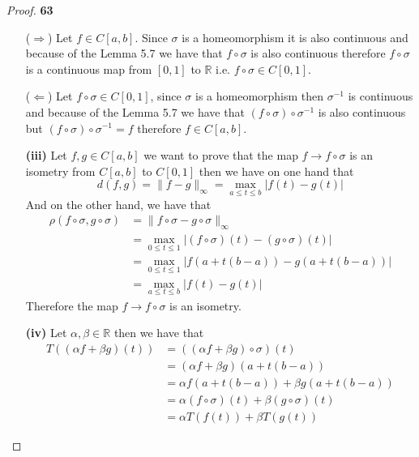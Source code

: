 \documentclass[11pt]{article}
\newcommand{\R}{\mathbb{R}}
\theoremstyle{definition}
\begin{document}
\begin{proof}{\textbf{63}}
\begin{itemize}
            ($\Rightarrow$) Let $f \in C[a,b]$. Since $\sigma$ is 
            a homeomorphism it is also continuous and because of the Lemma 5.7
            we have that $f \circ \sigma$ is also continuous therefore
            $f \circ \sigma$ is a continuous map from $[0,1]$ to $\R$ i.e.
            $f \circ \sigma \in C[0,1]$.

            ($\Leftarrow$) Let $f \circ \sigma \in C[0,1]$, since $\sigma$ is
            a homeomorphism then $\sigma^{-1}$ is continuous and because of the
            Lemma 5.7 we have that $(f \circ \sigma) \circ \sigma^{-1}$ is
            also continuous but $(f \circ \sigma) \circ \sigma^{-1} = f$
            therefore $f \in C[a,b]$.
\cleardoublepage
            \item [\textbf{(iii)}] Let $f,g \in C[a,b]$ we want to prove that
            the map $f \to f\circ\sigma$ is an isometry from $C[a,b]$ to
            $C[0,1]$ then we have on one hand that 
            $$d(f,g) = \|f - g\|_\infty = \max_{a\leq t\leq b}{|f(t) - g(t)|}$$
            And on the other hand, we have that
            \begin{align*}
                \rho(f\circ\sigma, g\circ\sigma)
                &= \|f\circ \sigma - g\circ \sigma\|_\infty\\
                &= \max_{0\leq t\leq 1}{|(f \circ \sigma)(t) - (g\circ\sigma)(t)|}\\
                &= \max_{0\leq t\leq 1}{|f(a + t(b-a)) - g(a + t(b-a))|}\\
                &= \max_{a\leq t\leq b}{|f(t) - g(t)|}
            \end{align*}
            Therefore the map $f \to f \circ\sigma$ is an isometry.

            \item [\textbf{(iv)}] Let $\alpha, \beta \in \R$ then we have that
            \begin{align*}
                T((\alpha f + \beta g)(t)) &= ((\alpha f + \beta g) \circ \sigma)(t)\\
                    &= (\alpha f + \beta g) (a + t(b-a))\\
                    &= \alpha f(a + t(b-a)) + \beta g(a + t(b-a))\\
                    &= \alpha (f\circ\sigma)(t) + \beta (g\circ\sigma)(t)\\
                    &= \alpha T(f(t)) + \beta T(g(t))
            \end{align*}


\end{itemize}
\end{proof}
\end{document}
